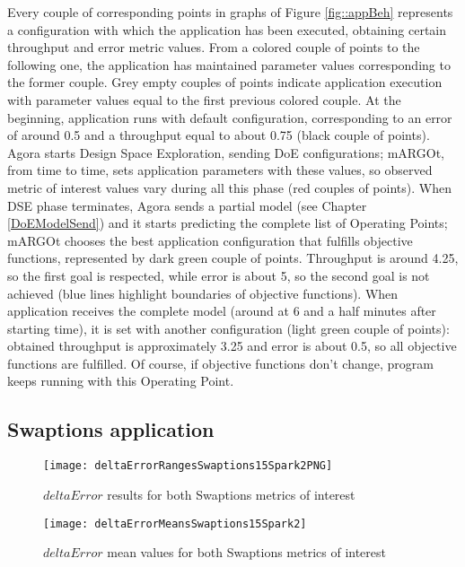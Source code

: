 Every couple of corresponding points in graphs of Figure \ref{fig::appBeh} represents a configuration with which the application has been executed, obtaining certain throughput and error metric values. From a colored couple of points to the following one, the application has maintained parameter values corresponding to the former couple. Grey empty couples of points indicate application execution with parameter values equal to the first previous colored couple. At the beginning, application runs with default configuration, corresponding to an error of around 0.5 and a throughput equal to about 0.75 (black couple of points). Agora starts Design Space Exploration, sending DoE configurations; mARGOt, from time to time, sets application parameters with these values, so observed metric of interest values vary during all this phase (red couples of points). When DSE phase terminates, Agora sends a partial model (see Chapter \ref{DoEModelSend}) and it starts predicting the complete list of Operating Points; mARGOt chooses the best application configuration that fulfills objective functions, represented by dark green couple of points. Throughput is around 4.25, so the first goal is respected, while error is about 5, so the second goal is not achieved (blue lines highlight boundaries of objective functions). When application receives the complete model (around at 6 and a half minutes after starting time), it is set with another configuration (light green couple of points): obtained throughput is approximately 3.25 and error is about 0.5, so all objective functions are fulfilled. Of course, if objective functions don't change, program keeps running with this Operating Point.





\subsection{Swaptions application}

\begin{figure}[htb]

    \centering
    \texttt{[image: deltaErrorRangesSwaptions15Spark2PNG]}
    \caption{$deltaError$ results for both Swaptions metrics of interest}
    \label{fig::swaptions15spark2::intervals}
    
\end{figure}

\begin{figure}[htb]

    \centering
    \texttt{[image: deltaErrorMeansSwaptions15Spark2]}
    \caption{$deltaError$ mean values for both Swaptions metrics of interest}
    \label{fig::swaptions15spark2::means}
    
\end{figure}	

